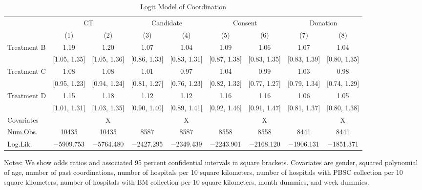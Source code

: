 \documentclass[
]{article}
\begin{document}
\begin{table}[H]

\caption{\label{tab:logit-coordination}Logit Model of Coordination}
\centering
\fontsize{9}{11}\selectfont
\begin{threeparttable}
\begin{tabular}[t]{lcccccccc}
\toprule
\multicolumn{1}{c}{ } & \multicolumn{2}{c}{CT} & \multicolumn{2}{c}{Candidate} & \multicolumn{2}{c}{Consent} & \multicolumn{2}{c}{Donation} \\
\cmidrule(l{3pt}r{3pt}){2-3} \cmidrule(l{3pt}r{3pt}){4-5} \cmidrule(l{3pt}r{3pt}){6-7} \cmidrule(l{3pt}r{3pt}){8-9}
  & (1) & (2) & (3) & (4) & (5) & (6) & (7) & (8)\\
\midrule
Treatment B & \num{1.19} & \num{1.20} & \num{1.07} & \num{1.04} & \num{1.09} & \num{1.06} & \num{1.07} & \num{1.04}\\
 & {}[\num{1.05}, \num{1.35}] & {}[\num{1.05}, \num{1.36}] & {}[\num{0.86}, \num{1.33}] & {}[\num{0.83}, \num{1.31}] & {}[\num{0.87}, \num{1.38}] & {}[\num{0.83}, \num{1.35}] & {}[\num{0.83}, \num{1.39}] & {}[\num{0.80}, \num{1.35}]\\
Treatment C & \num{1.08} & \num{1.08} & \num{1.01} & \num{0.97} & \num{1.04} & \num{0.99} & \num{1.03} & \num{0.98}\\
 & {}[\num{0.95}, \num{1.23}] & {}[\num{0.94}, \num{1.24}] & {}[\num{0.81}, \num{1.27}] & {}[\num{0.76}, \num{1.23}] & {}[\num{0.82}, \num{1.32}] & {}[\num{0.77}, \num{1.27}] & {}[\num{0.79}, \num{1.34}] & {}[\num{0.74}, \num{1.29}]\\
Treatment D & \num{1.15} & \num{1.18} & \num{1.12} & \num{1.12} & \num{1.16} & \num{1.16} & \num{1.06} & \num{1.05}\\
 & {}[\num{1.01}, \num{1.31}] & {}[\num{1.03}, \num{1.35}] & {}[\num{0.90}, \num{1.40}] & {}[\num{0.89}, \num{1.41}] & {}[\num{0.92}, \num{1.46}] & {}[\num{0.91}, \num{1.47}] & {}[\num{0.81}, \num{1.37}] & {}[\num{0.80}, \num{1.38}]\\
\midrule
Covariates &  & X &  & X &  & X &  & X\\
Num.Obs. & \num{10435} & \num{10435} & \num{8587} & \num{8587} & \num{8558} & \num{8558} & \num{8441} & \num{8441}\\
Log.Lik. & \num{-5909.753} & \num{-5764.480} & \num{-2427.295} & \num{-2349.439} & \num{-2243.901} & \num{-2168.120} & \num{-1906.131} & \num{-1851.371}\\
\bottomrule
\end{tabular}
\begin{tablenotes}
\item Notes: We show odds ratios and associated 95 percent confidential intervals in square brackets. Covariates are gender, squared polynomial of age, number of past coordinations, number of hospitals per 10 square kilometers, number of hospitals with PBSC collection per 10 square kilometers, number of hospitals with BM collection per 10 square kilometers, month dummies, and week dummies.
\end{tablenotes}
\end{threeparttable}
\end{table}
\end{document}
